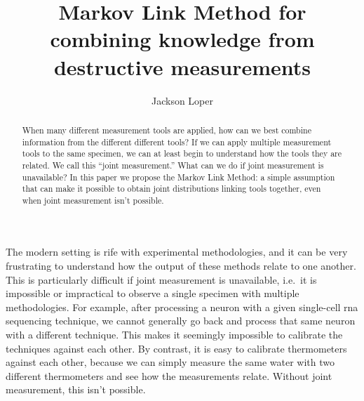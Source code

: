 



\DeclareMathOperator*{\tr}{tr}

\newcommand{\UN}[1]{\ensuremath{\left|#1\right|_\infty}}
\newcommand{\EN}[1]{\ensuremath{\left|#1\right|}}
\newcommand{\kldiv}[2]{\ensuremath{D\left(#1||#2\right)}}

\usepackage{cancel}


\title{Markov Link Method for combining knowledge from destructive measurements}
\author{Jackson Loper}

\usepackage{amsthm}
\newtheorem*{thm}{Theorem}
\newtheorem{lem}{Lemma}
\newtheorem{conj}{Conjecture}


\maketitle

\begin{abstract}
When many different measurement tools are applied, how can we best combine information from the different different tools?  If we can apply multiple measurement tools to the same specimen, we can at least begin to understand how the tools they are related.  We call this ``joint measurement.''  What can we do if joint measurement is unavailable?  In this paper we propose the Markov Link Method: a simple assumption that can make it possible to obtain joint distributions linking tools together, even when joint measurement isn't possible.
\end{abstract}

The modern setting is rife with experimental methodologies, and it can be very frustrating to understand how the output of these methods relate to one another.  This is particularly difficult if joint measurement is unavailable, i.e.\ it is impossible or impractical to observe a single specimen with multiple methodologies.  For example, after processing a neuron with a given single-cell rna sequencing technique, we cannot generally go back and process that same neuron with a different technique.   This makes it seemingly impossible to calibrate the techniques against each other.  By contrast, it is easy to calibrate thermometers against each other, because we can simply measure the same water with two different thermometers and see how the measurements relate.  Without joint measurement, this isn't possible.


